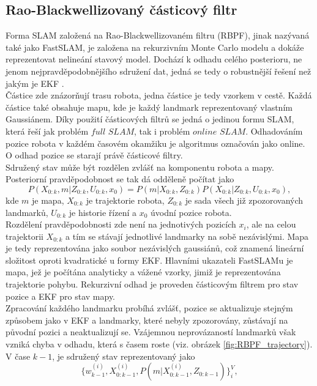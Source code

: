 \documentclass[12pt]{report}
\begin{document}
\subsection{Rao-Blackwellizovaný částicový filtr}
Forma SLAM založená na Rao-Blackwellizovaném filtru (RBPF), jinak nazývaná také jako FastSLAM, je založena na rekurzivním Monte Carlo modelu a dokáže reprezentovat nelineání stavový model. Dochází k odhadu celého posterioru, ne jenom nejpravděpodobnějšího sdružení dat, jedná se tedy o robustnější řešení než jakým je EKF \cite{Thrun2005}. \\
\indent Částice zde znázorňují trasu robota, jedna částice je tedy vzorkem v cestě. Každá částice také obsahuje mapu, kde je každý landmark reprezentovaný vlastním Gaussiánem. Díky použití částicových filtrů se jedná o jedinou formu SLAM, která řeší jak problém $full$ $SLAM$, tak i problém $online$ $SLAM$. Odhadováním pozice robota v každém časovém okamžiku je algoritmus označován jako online. O odhad pozice se starají právě částicové filtry.\\
\indent Sdružený stav může být rozdělen zvlášť na komponentu robota a mapy. Posteriorní pravděpodobnost se tak dá odděleně počítat jako
\begin{equation}
	P(X_{0:k},m|Z_{0:k},U_{0:k},x_0)=P(m|X_{0:k},Z_{0:k})P(X_{0:k}|Z_{0:k},U_{0:k},x_0),
\end{equation}
kde $m$ je mapa, $X_{0:k}$ je trajektorie robota, $Z_{0:k}$ je sada všech již zpozorovaných landmarků, $U_{0:k}$ je historie řízení a $x_0$ úvodní pozice robota.\\
\indent Rozdělení pravděpodobnosti zde není na jednotivých pozicích $x_i$, ale na celou trajektorii $X_{0:k}$ a tím se stávají jednotlivé landmarky na sobě nezávislými. Mapa je tedy reprezentována jako soubor nezávislých gaussiánů, což znamená lineární složitost oproti kvadratické u formy EKF. Hlavními ukazateli FastSLAMu je mapa, jež je počítána analyticky a vážené vzorky, jimiž je reprezentována trajektorie pohybu. Rekurzivní odhad je proveden částicovým filtrem pro stav pozice a EKF pro stav mapy.\\
\indent Zpracování každého landmarku probíhá zvlášť, pozice se aktualizuje stejným způsobem jako v EKF a landmarky, které nebyly zpozorovány, zůstávají na původní pozici a neaktualizují se. Vzájemnou neprovázaností landmarků však vzniká chyba v odhadu, která s časem roste (viz. obrázek \ref{fig:RBPF_trajectory}).\\
\indent V čase $k-1$, je sdružený stav reprezentovaný jako 
\begin{equation}
	\{w^{(i)}_{k-1},X^{(i)}_{0:k-1},P(m|X^{(i)}_{0:k-1},Z_{0:k-1})\}^V_i,
\end{equation}
\end{document}
